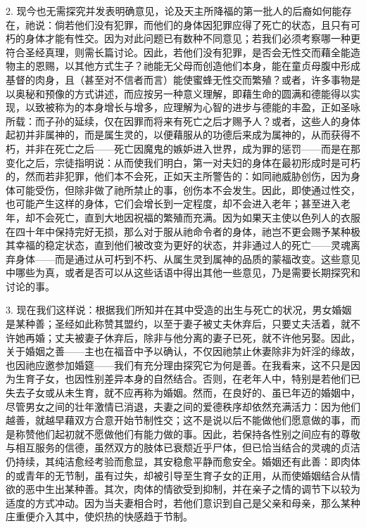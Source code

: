 2. 现今也无需探究并发表明确意见，论及天主所降福的第一批人的后裔如何能存在，祂说：倘若他们没有犯罪，而他们的身体因犯罪应得了死亡的状态，且只有可朽的身体才能有性交。因为对此问题已有数种不同意见；若我们必须考察哪一种更符合圣经真理，则需长篇讨论。因此，若他们没有犯罪，是否会无性交而藉全能造物主的恩赐，以其他方式生子？祂能无父母而创造他们本身，能在童贞母腹中形成基督的肉身，且（甚至对不信者而言）能使蜜蜂无性交而繁殖？或者，许多事物是以奥秘和预像的方式讲述，而应按另一种意义理解，即藉生命的圆满和德能得以实现，以致被称为的本身增长与增多，应理解为心智的进步与德能的丰盈，正如圣咏所载：而子孙的延续，仅在因罪而将来有死亡之后才赐予人？或者，这些人的身体起初并非属神的，而是属生灵的，以便藉服从的功德后来成为属神的，从而获得不朽，并非在死亡之后——死亡因魔鬼的嫉妒进入世界，成为罪的惩罚——而是在那变化之后，宗徒指明说：从而使我们明白，第一对夫妇的身体在最初形成时是可朽的，然而若非犯罪，他们本不会死，正如天主所警告的：如同祂威胁创伤，因为身体可能受伤，但除非做了祂所禁止的事，创伤本不会发生。因此，即使通过性交，也可能产生这样的身体，它们会增长到一定程度，却不会进入老年；甚至进入老年，却不会死亡，直到大地因祝福的繁殖而充满。因为如果天主使以色列人的衣服在四十年中保持完好无损，那么对于服从祂命令者的身体，祂岂不更会赐予某种极其幸福的稳定状态，直到他们被改变为更好的状态，并非通过人的死亡——灵魂离弃身体——而是通过从可朽到不朽、从属生灵到属神的品质的蒙福改变。这些意见中哪些为真，或者是否可以从这些话语中得出其他一些意见，乃是需要长期探究和讨论的事。\par

3. 现在我们这样说：根据我们所知并在其中受造的出生与死亡的状况，男女婚姻是某种善；圣经如此称赞其盟约，以至于妻子被丈夫休弃后，只要丈夫活着，就不许她再婚；丈夫被妻子休弃后，除非与他分离的妻子已死，就不许他另娶。因此，关于婚姻之善——主也在福音中予以确认，不仅因祂禁止休妻除非为奸淫的缘故，也因祂应邀参加婚筵——我们有充分理由探究它为何是善。在我看来，这不只是因为生育子女，也因性别差异本身的自然结合。否则，在老年人中，特别是若他们已失去子女或从未生育，就不应再称为婚姻。然而，在良好的、虽已年迈的婚姻中，尽管男女之间的壮年激情已消退，夫妻之间的爱德秩序却依然充满活力：因为他们越善，就越早藉双方合意开始节制性交；这不是说以后不能做他们愿意做的事，而是称赞他们起初就不愿做他们有能力做的事。因此，若保持各性别之间应有的尊敬与相互服务的信德，虽然双方的肢体已衰颓近乎尸体，但已恰当结合的灵魂的贞洁仍持续，其纯洁愈经考验而愈显，其安稳愈平静而愈安全。婚姻还有此善：即肉体的或青年的无节制，虽有过失，却被引导至生育子女的正用，从而使婚姻结合从情欲的恶中生出某种善。其次，肉体的情欲受到抑制，并在亲子之情的调节下以较为适度的方式冲动。因为当夫妻相合时，若他们意识到自己是父亲和母亲，那么某种庄重便介入其中，使炽热的快感趋于节制。\par

